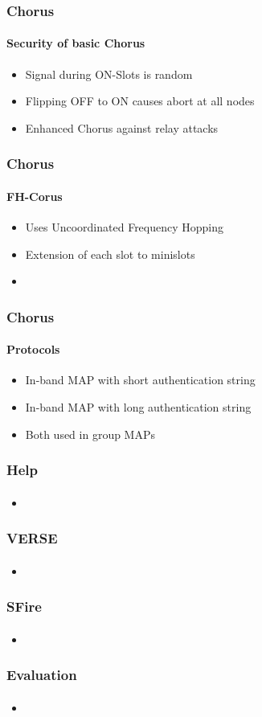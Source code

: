 \documentclass{beamer}
\begin{document}
\begin{frame}
	\frametitle{Chorus}
	\framesubtitle{Security of basic Chorus}
	\begin{itemize}
		\item Signal during ON-Slots is random
		\item Flipping OFF to ON causes abort at all nodes
		\item Enhanced Chorus against relay attacks 
	\end{itemize}
\end{frame}

\begin{frame}
	\frametitle{Chorus}
	\framesubtitle{FH-Corus}
	\begin{itemize}
		\item Uses Uncoordinated Frequency Hopping
		\item Extension of each slot to minislots 
		\item  
	\end{itemize}
\end{frame}

\begin{frame}
	\frametitle{Chorus}
	\framesubtitle{Protocols}
	\begin{itemize}
		\item In-band MAP with short authentication string
		\item In-band MAP with long authentication string
		\item Both used in group MAPs
	\end{itemize}
\end{frame}

\begin{frame}
	\frametitle{Help}
	\framesubtitle{}
	\begin{itemize}
		\item 
	\end{itemize}
\end{frame}

\begin{frame}
	\frametitle{VERSE}
	\framesubtitle{}
	\begin{itemize}
		\item 
	\end{itemize}
\end{frame}

\begin{frame}
	\frametitle{SFire}
	\framesubtitle{}
	\begin{itemize}
		\item 
	\end{itemize}
\end{frame}

\begin{frame}
	\frametitle{Evaluation}
	\framesubtitle{}
	\begin{itemize}
		\item 
	\end{itemize}
\end{frame}
\end{document}
